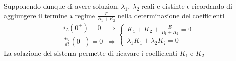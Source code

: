 Supponendo dunque di avere soluzioni $\lambda_1,\ \lambda_2$ reali e distinte e ricordando di aggiungere
il termine a regime $\frac{E}{R_1 + R_2}$ nella determinazione dei coefficienti
$$
\begin{aligned}
i_L(0^+) = 0 & \Rightarrow \\
\frac{di_L}{dt}(0^+) = 0 & \Rightarrow
\end{aligned}
\begin{cases}
K_1+K_2 + \frac{E}{R_1+R_2} = 0 \\
\lambda_1K_1 + \lambda_2K_2 = 0
\end{cases}
$$
La soluzione del sistema permette di ricavare i coefficienti $K_1$ e $K_2$

